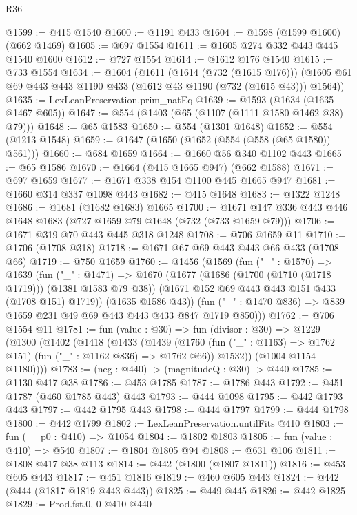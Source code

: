 \begin{lexlean}{R36}
\begin{coremodule}
@1599 := @415 @1540
@1600 := @1191 @433
@1604 := @1598 (@1599 @1600) (@662 @1469)
@1605 := @697 @1554
@1611 := @1605 @274 @332 @443 @445 @1540 @1600
@1612 := @727 @1554
@1614 := @1612 @176 @1540
@1615 := @733 @1554
@1634 := @1604
    (@1611
      (@1614 (@732 (@1615 @176)))
      (@1605 @61 @69 @443 @443 @1190 @433 (@1612 @43 @1190 (@732 (@1615 @43))) @1564))
@1635 := LexLeanPreservation.prim_natEq
@1639 := @1593 (@1634 (@1635 @1467 @605))
@1647 := @554 (@1403 (@65 (@1107 (@1111 @1580 @1462 @38) @79)))
@1648 := @65 @1583
@1650 := @554 (@1301 @1648)
@1652 := @554 (@1213 @1548)
@1659 := @1647 (@1650 (@1652 (@554 (@558 (@65 @1580)) @561)))
@1660 := @684 @1659
@1664 := @1660 @56 @340 @1102 @443
@1665 := @65 @1586
@1670 := @1664 (@415 @1665 @947) (@662 @1588)
@1671 := @697 @1659
@1677 := @1671 @338 @154 @1100 @445 @1665 @947
@1681 := @1660 @314 @337 @1098 @443
@1682 := @415 @1648
@1683 := @1322 @1248
@1686 := @1681 (@1682 @1683) @1665
@1700 := @1671 @147 @336 @443 @446 @1648 @1683 (@727 @1659 @79 @1648 (@732 (@733 @1659 @79)))
@1706 := @1671 @319 @70 @443 @445 @318 @1248
@1708 := @706 @1659 @11
@1710 := @1706 (@1708 @318)
@1718 := @1671 @67 @69 @443 @443 @66 @433 (@1708 @66)
@1719 := @750 @1659
@1760 := @1456
    (@1569
      (fun ("_" : @1570) =>
      @1639
        (fun ("_" : @1471) =>
        @1670
          (@1677
            (@1686 (@1700 (@1710 (@1718 @1719))) (@1381 @1583 @79 @38))
            (@1671 @152 @69 @443 @443 @151 @433 (@1708 @151) @1719))
          (@1635 @1586 @43))
        (fun ("_" : @1470 @836) => @839 @1659 @231 @49 @69 @443 @443 @433 @847 @1719 @850)))
@1762 := @706 @1554 @11
@1781 := fun (value : @30) =>
  fun (divisor : @30) =>
  @1229
    (@1300
      (@1402
        (@1418
          (@1433
            (@1439
              (@1760 (fun ("_" : @1163) => @1762 @151) (fun ("_" : @1162 @836) => @1762 @66))
              @1532))
          (@1004 @1154 @1180))))
@1783 := (neg : @440) -> (magnitudeQ : @30) -> @440
@1785 := @1130 @417 @38
@1786 := @453 @1785
@1787 := @1786 @443
@1792 := @451 @1787 (@460 @1785 @443) @443
@1793 := @444 @1098
@1795 := @442 @1793 @443
@1797 := @442 @1795 @443
@1798 := @444 @1797
@1799 := @444 @1798
@1800 := @442 @1799
@1802 := LexLeanPreservation.untilFits @410
@1803 := fun (__p0 : @410) => @1054
@1804 := @1802 @1803
@1805 := fun (value : @410) => @540
@1807 := @1804 @1805 @94
@1808 := @631 @106
@1811 := @1808 @417 @38 @113
@1814 := @442 (@1800 (@1807 @1811))
@1816 := @453 @605 @443
@1817 := @451 @1816
@1819 := @460 @605 @443
@1824 := @442 (@444 (@1817 @1819 @443 @443))
@1825 := @449 @445
@1826 := @442 @1825
@1829 := Prod.fst.{0, 0} @410 @440

\end{coremodule}
\end{lexlean}
